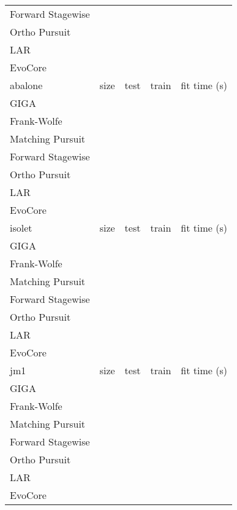 \documentclass{article}
\begin{document}
\begin{table}[!ht]
\begin{center}
\begin{small}
\begin{sc}
{\begin{tabular}{@{}lllll@{}}
Forward Stagewise &  &  &  &  \\
Ortho Pursuit & \bm{} &  &  & \bm{} \\
LAR &  &  &  &  \\
EvoCore &  & \bm{} &  &  \\
\midrule
abalone & size & test   & train   & fit time (s) \\ 
\midrule
GIGA &  &  &  &  \\
Frank-Wolfe &  &  &  &  \\
Matching Pursuit &  &  &  &  \\
Forward Stagewise &  &  &  &  \\
Ortho Pursuit & \bm{} &  &  &  \\
LAR & \bm{} &  &  &  \\
EvoCore &  & \bm{} &  &  \\
\midrule
isolet & size & test   & train   & fit time (s) \\ 
\midrule
GIGA &  &  &  &  \\
Frank-Wolfe &  &  &  &  \\
Matching Pursuit &  &  &  &  \\
Forward Stagewise &  &  &  &  \\
Ortho Pursuit & \bm{} &  &  &  \\
LAR &  &  &  &  \\
EvoCore &  & \bm{} &  &  \\
\midrule
jm1 & size & test   & train   & fit time (s) \\ 
\midrule
GIGA &  &  &  &  \\
Frank-Wolfe &  &  &  &  \\
Matching Pursuit &  &  &  &  \\
Forward Stagewise &  &  &  &  \\
Ortho Pursuit & \bm{} &  &  & \bm{} \\
LAR &  &  &  &  \\
EvoCore &  & \bm{} &  &  \\
\bottomrule
\end{tabular}}
\end{sc}
\end{small}
\end{center}
\vskip -0.1in
\end{table}
\end{document}
